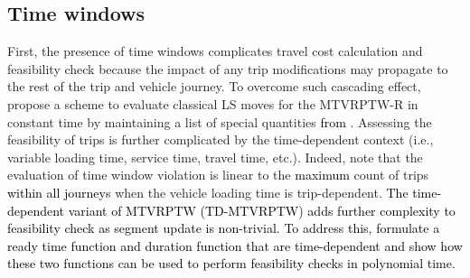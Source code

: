 \documentclass[11pt]{article}
\newcommand\add[1]{\textcolor{black}{#1}}
\begin{document}
\subsection{Time windows}
First, the presence of time windows complicates travel cost calculation and feasibility check because the impact of any trip modifications may propagate to the rest of the trip and vehicle journey.  To overcome such cascading effect, \cite{cattaruzza2016multi} propose a scheme to evaluate classical LS moves for the MTVRPTW-R in constant time by maintaining a list of special quantities \add{from \cite{vidal2013hybrid}}.  Assessing the feasibility of trips is further complicated by the time-dependent context (i.e., variable loading time, service time, travel time, etc.).  Indeed, \cite{cattaruzza2016multi} note that the evaluation of time window violation is linear to the \add{maximum} count of trips \add{within all journeys} when the vehicle loading time is trip-dependent.  \add{The time-dependent variant of MTVRPTW (TD-MTVRPTW) adds further complexity to feasibility check as segment update is non-trivial.  To address this, \cite{pan2021multi} formulate a ready time function and duration function that are time-dependent and show how these two functions can be used to perform feasibility checks in polynomial time.}
\newline
\end{document}
